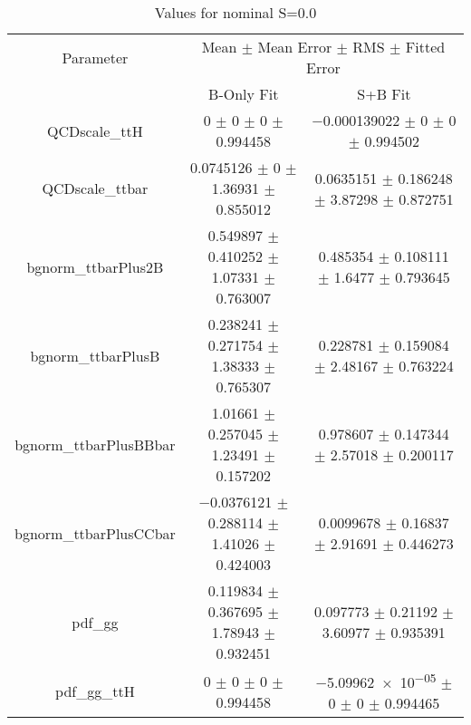 \begin{table}
\centering
\caption{Values for nominal S=0.0}
\begin{tabular}{ccc}
\toprule
Parameter & \multicolumn{2}{c}{Mean $\pm$ Mean Error $\pm$ RMS $\pm$ Fitted Error}\\
 & B-Only Fit & S+B Fit\\
\midrule
QCDscale\_ttH & \num{0} $\pm$ \num{0} $\pm$ \num{0} $\pm$ \num{0.994458} & \num{-0.000139022} $\pm$ \num{0} $\pm$ \num{0} $\pm$ \num{0.994502}\\
QCDscale\_ttbar & \num{0.0745126} $\pm$ \num{0} $\pm$ \num{1.36931} $\pm$ \num{0.855012} & \num{0.0635151} $\pm$ \num{0.186248} $\pm$ \num{3.87298} $\pm$ \num{0.872751}\\
bgnorm\_ttbarPlus2B & \num{0.549897} $\pm$ \num{0.410252} $\pm$ \num{1.07331} $\pm$ \num{0.763007} & \num{0.485354} $\pm$ \num{0.108111} $\pm$ \num{1.6477} $\pm$ \num{0.793645}\\
bgnorm\_ttbarPlusB & \num{0.238241} $\pm$ \num{0.271754} $\pm$ \num{1.38333} $\pm$ \num{0.765307} & \num{0.228781} $\pm$ \num{0.159084} $\pm$ \num{2.48167} $\pm$ \num{0.763224}\\
bgnorm\_ttbarPlusBBbar & \num{1.01661} $\pm$ \num{0.257045} $\pm$ \num{1.23491} $\pm$ \num{0.157202} & \num{0.978607} $\pm$ \num{0.147344} $\pm$ \num{2.57018} $\pm$ \num{0.200117}\\
bgnorm\_ttbarPlusCCbar & \num{-0.0376121} $\pm$ \num{0.288114} $\pm$ \num{1.41026} $\pm$ \num{0.424003} & \num{0.0099678} $\pm$ \num{0.16837} $\pm$ \num{2.91691} $\pm$ \num{0.446273}\\
pdf\_gg & \num{0.119834} $\pm$ \num{0.367695} $\pm$ \num{1.78943} $\pm$ \num{0.932451} & \num{0.097773} $\pm$ \num{0.21192} $\pm$ \num{3.60977} $\pm$ \num{0.935391}\\
pdf\_gg\_ttH & \num{0} $\pm$ \num{0} $\pm$ \num{0} $\pm$ \num{0.994458} & \num{-5.09962e-05} $\pm$ \num{0} $\pm$ \num{0} $\pm$ \num{0.994465}\\
\bottomrule
\end{tabular}
\end{table}